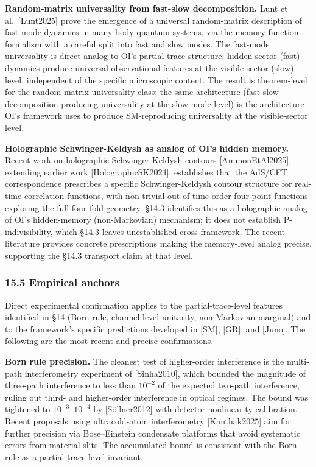 \documentclass[
]{article}
\begin{document}
\textbf{Random-matrix universality from fast-slow decomposition.} Lunt
et al.~{[}Lunt2025{]} prove the emergence of a universal random-matrix
description of fast-mode dynamics in many-body quantum systems, via the
memory-function formalism with a careful split into fast and slow modes.
The fast-mode universality is direct analog to OI's partial-trace
structure: hidden-sector (fast) dynamics produce universal observational
features at the visible-sector (slow) level, independent of the specific
microscopic content. The result is theorem-level for the random-matrix
universality class; the same architecture (fast-slow decomposition
producing universality at the slow-mode level) is the architecture OI's
framework uses to produce SM-reproducing universality at the
visible-sector level.

\textbf{Holographic Schwinger-Keldysh as analog of OI's hidden memory.}
Recent work on holographic Schwinger-Keldysh contours
{[}AmmonEtAl2025{]}, extending earlier work {[}HolographicSK2024{]},
establishes that the AdS/CFT correspondence prescribes a specific
Schwinger-Keldysh contour structure for real-time correlation functions,
with non-trivial out-of-time-order four-point functions exploring the
full four-fold geometry. §14.3 identifies this as a holographic analog
of OI's hidden-memory (non-Markovian) mechanism; it does not establish
P-indivisibility, which §14.3 leaves unestablished cross-framework. The
recent literature provides concrete prescriptions making the
memory-level analog precise, supporting the §14.3 transport claim at
that level.

\hypertarget{empirical-anchors}{%
\subsubsection{15.5 Empirical anchors}\label{empirical-anchors}}

Direct experimental confirmation applies to the partial-trace-level
features identified in §14 (Born rule, channel-level unitarity,
non-Markovian marginal) and to the framework's specific predictions
developed in {[}SM{]}, {[}GR{]}, and {[}Juno{]}. The following are the
most recent and precise confirmations.

\textbf{Born rule precision.} The cleanest test of higher-order
interference is the multi-path interferometry experiment of
{[}Sinha2010{]}, which bounded the magnitude of three-path interference
to less than \(10^{-2}\) of the expected two-path interference, ruling
out third- and higher-order interference in optical regimes. The bound
was tightened to \(10^{-3}\)--\(10^{-4}\) by {[}Söllner2012{]} with
detector-nonlinearity calibration. Recent proposals using ultracold-atom
interferometry {[}Kanthak2025{]} aim for further precision via
Bose--Einstein condensate platforms that avoid systematic errors from
material slits. The accumulated bound is consistent with the Born rule
as a partial-trace-level invariant.
\end{document}

